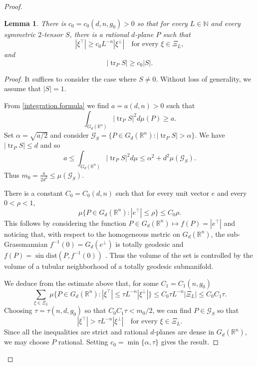 \documentclass[11pt]{amsart}
\def\R{\mathbb R}
\def\N{\mathbb N}
\def\tr{\operatorname{tr}}
\newtheorem{lemm}[thm]{Lemma}
\theoremstyle{remark}
\theoremstyle{definition}
\begin{document}
\begin{proof}
		
		\begin{lemm}\label{choice.vector} 
			There is {$c_0=c_0(d,n,g_0)>0$} so that for every $L\in \N$ and every symmetric $2$-tensor $S$, there is a rational $d$-plane $P$ such that
			$$
			|\xi^{\top}|\geq c_0L^{-n}|\xi^{\bot}|\quad\text{for every } \xi\in \Xi_L,
			$$
			and
			$$
			|\tr _P S|\geq c_0|S|.
			$$
		\end{lemm}
		
		\begin{proof}
			It suffices to consider the case where  $S\neq0$. Without loss of generality, we assume that $|S|=1$.
			
			From \eqref{integration.formula} we find $a=a(d,n)>0$ such that 
			$$
			\int_{G_d(\R^n)}|\tr _P S|^2d\mu(P)\geq a.
			$$
			Set $\alpha=\sqrt{a/2}$ and consider $
			\mathcal G_S=\{P\in G_d(\R^n):|\tr _P S|>\alpha\}
			$. We have $|\tr _P S|\leq d$ and so 
			$$
			a\leq \int_{G_d(\R^n)}|\tr _P S|^2d\mu\leq \alpha^2+d^2\mu(\mathcal G_S).
			$$
			Thus 
			$
			m_0=\frac{a}{2d^2}\leq \mu(\mathcal G_S).
			$
			
			There is a constant $C_0=C_0(d,n)$ such that for every unit vector $e$ and every $0<\rho<1$,
			$$
			\mu\{P\in G_d(\R^n):|e^{\top}|\leq \rho\}\leq C_0\rho.
			$$
			This follows by considering the function $P\in G_d(\R^n)\mapsto f(P)=|e^{\top}|$ and noticing that, with respect to the homogeneous metric on $G_d(\R^n)$,  the sub-Grassmannian $f^{-1}(0)=G_d(e^\perp)$ is totally geodesic and $f(P)=\sin\text{dist}(P,f^{-1}(0))$ \cite[Theorem~6]{Ye16}. Thus the volume of the set is controlled by the volume of a tubular neighborhood of a totally geodesic submanifold.
			
			We deduce from the estimate above that{, for some $C_1=C_1(n,g_0)$} 
			$$
			\sum_{\xi\in\Xi_L}\mu\{P\in G_d(\R^n):|\xi^\top|\leq \tau L^{-n}|\xi^\bot|\}\leq C_0\tau L^{-n}|\Xi_L|\leq C_0C_1\tau.
			$$
			Choosing $\tau=\tau(n,d,g_0)$ so that {$C_0C_1\tau<m_0/2$,}  we can find $P\in \mathcal G_S$ so that
			$$
			|\xi^\top|>\tau L^{-n}|\xi^\bot|\quad\text{for every }\xi\in\Xi_L.
			$$
			Since all the inequalities are strict and rational $d$-planes are dense in $G_d(\R^n)$, we may choose $P$ rational. Setting $c_0=\min\{\alpha,\tau\}$ gives the result.
		\end{proof}
		

\end{proof}
\end{document}
